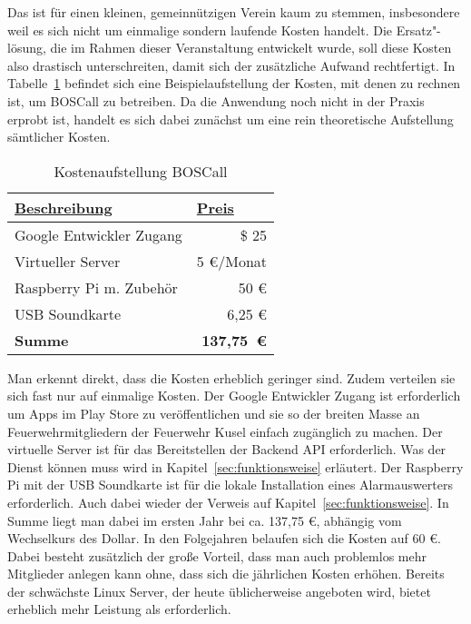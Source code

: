 Das ist für einen kleinen, gemeinnützigen Verein kaum zu stemmen, insbesondere weil es sich nicht um einmalige sondern laufende Kosten handelt. Die Ersatz"-lösung, die im Rahmen dieser Veranstaltung entwickelt wurde, soll diese Kosten also drastisch unterschreiten, damit sich der zusätzliche Aufwand rechtfertigt. In Tabelle~\ref{tbl:BOSCallPricing} befindet sich eine Beispielaufstellung der Kosten, mit denen zu rechnen ist, um BOSCall zu betreiben. Da die Anwendung noch nicht in der Praxis erprobt ist, handelt es sich dabei zunächst um eine rein theoretische Aufstellung sämtlicher Kosten.

\begin{table}[]
	\centering
	\caption{Kostenaufstellung BOSCall}
	\label{tbl:BOSCallPricing}
	\begin{tabular}{|l|r|}
		\hline
		{\ul \textbf{Beschreibung}} & \multicolumn{1}{l|}{{\ul \textbf{Preis}}} \\ \hline
		Google Entwickler Zugang    & \$ 25                                     \\ \hline
		Virtueller Server           & 5 €/Monat                                 \\ \hline
		Raspberry Pi m. Zubehör     & 50 €                                      \\ \hline
		USB Soundkarte              & 6,25 €                                    \\ \hline \hline
		\textbf{Summe}                  & \textbf{137,75~€}                                  \\ \hline
	\end{tabular}
\end{table}

Man erkennt direkt, dass die Kosten erheblich geringer sind. Zudem verteilen sie sich fast nur auf einmalige Kosten. Der Google Entwickler Zugang ist erforderlich um Apps im Play Store zu veröffentlichen und sie so der breiten Masse an Feuerwehrmitgliedern der Feuerwehr Kusel einfach zugänglich zu machen. Der virtuelle Server ist für das Bereitstellen der Backend API erforderlich. Was der Dienst können muss wird in Kapitel~\ref{sec:funktionsweise} erläutert.  Der Raspberry Pi mit der USB Soundkarte ist für die lokale Installation eines Alarmauswerters erforderlich. Auch dabei wieder der Verweis auf Kapitel~\ref{sec:funktionsweise}. In Summe liegt man dabei im ersten Jahr bei ca. 137,75 €, abhängig vom Wechselkurs des Dollar. In den Folgejahren belaufen sich die Kosten auf 60 €. Dabei besteht zusätzlich der große Vorteil, dass man auch problemlos mehr Mitglieder anlegen kann ohne, dass sich die jährlichen Kosten erhöhen. Bereits der schwächste Linux Server, der heute üblicherweise angeboten wird, bietet erheblich mehr Leistung als erforderlich.